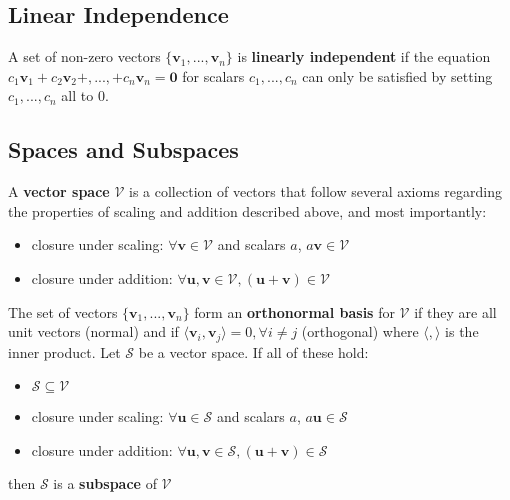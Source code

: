 \documentclass{harvardml}
\theoremstyle{definition}
\theoremstyle{plain}
\renewcommand{\v}[1]{\mathbf{#1}}
\begin{document}
    \subsection{Linear Independence}
        
        A set of non-zero vectors $\{\v v_1,...,\v v_n\}$ is 
		\textbf{linearly independent} if the equation 
		$c_1\v v_1 + c_2\v v_2 +,...,+ c_n\v v_n = \v 0$ 
        for scalars $c_1,...,c_n$ can only be satisfied by setting 
		$c_1,...,c_n$ all to $0$.

    \subsection{Spaces and Subspaces}

        A \textbf{vector space} $\mathcal{V}$ is a collection of 
		vectors that follow several axioms regarding the properties 
		of scaling and addition described above, and most importantly:
            \begin{itemize}
                \item closure under scaling: 
					  $\forall \v v \in \mathcal{V}$ 
					  and scalars $a$,
                      $ a \v v \in \mathcal{V}$
                \item closure under addition: 
					  $\forall \v u, 
					  \v v \in \mathcal{V},
                      (\v u + \v v) \in \mathcal{V}$
            \end{itemize}
        \noindent The set of vectors $\{\v v_1,...,\v v_n\}$ form an 
        \textbf{orthonormal basis} for $\mathcal{V}$ if 
        they are all unit vectors (normal) and if $\langle \v v_i, 
        \v v_j \rangle = 0,\forall i \neq j$ (orthogonal) where 
		$\langle,\rangle$ is the inner product. Let $\mathcal{S}$ 
		be a vector space. If all of these hold:
        \begin{itemize}
            \item $\mathcal{S} \subseteq \mathcal{V}$
            \item closure under scaling: $\forall \v u 
				  \in \mathcal{S}$ and scalars $a$, $a\v u 
				  \in \mathcal{S}$
            \item closure under addition: $\forall \v u, 
				  \v v \in \mathcal{S}, 
                  (\v u + \v v) \in \mathcal{S}$
        \end{itemize}
        \noindent then $\mathcal{S}$ is a \textbf{subspace} 
		of $\mathcal{V}$
\end{document}
